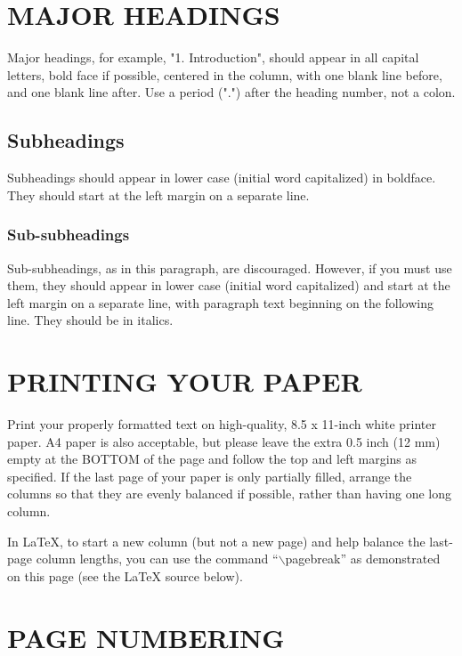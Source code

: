 \documentclass{article}
\begin{document}
\section{MAJOR HEADINGS}
\label{sec:majhead}

Major headings, for example, "1. Introduction", should appear in all capital
letters, bold face if possible, centered in the column, with one blank line
before, and one blank line after. Use a period (".") after the heading number,
not a colon.

\subsection{Subheadings}
\label{ssec:subhead}

Subheadings should appear in lower case (initial word capitalized) in
boldface.  They should start at the left margin on a separate line.
 
\subsubsection{Sub-subheadings}
\label{sssec:subsubhead}

Sub-subheadings, as in this paragraph, are discouraged. However, if you
must use them, they should appear in lower case (initial word
capitalized) and start at the left margin on a separate line, with paragraph
text beginning on the following line.  They should be in italics.

\section{PRINTING YOUR PAPER}
\label{sec:print}

Print your properly formatted text on high-quality, 8.5 x 11-inch white printer
paper. A4 paper is also acceptable, but please leave the extra 0.5 inch (12 mm)
empty at the BOTTOM of the page and follow the top and left margins as
specified.  If the last page of your paper is only partially filled, arrange
the columns so that they are evenly balanced if possible, rather than having
one long column.

In LaTeX, to start a new column (but not a new page) and help balance the
last-page column lengths, you can use the command ``$\backslash$pagebreak'' as
demonstrated on this page (see the LaTeX source below).

\section{PAGE NUMBERING}
\label{sec:page}
\end{document}
